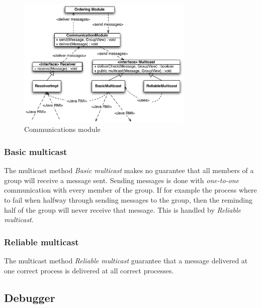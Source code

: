 \documentclass[titlepage, twocolumn, a4paper, 10pt]{article}
\begin{document}
\begin{figure}[!thb]
  \centering
  \includegraphics[width=3.3in]{images/ComModule.pdf}
  \caption{Communications module}
  \label{fig:images/commodule}
\end{figure}

\subsubsection{Basic multicast}\label{sec:basic-multicast}
The multicast method \textit{Basic multicast} makes no guarantee that
all members of a group will receive a message sent. Sending messages
is done with \textit{one-to-one} communication with every member of
the group. If for example the process where to fail when halfway
through sending messages to the group, then the reminding half of the
group will never receive that message. This is handled by
\textit{Reliable multicast}.

\subsubsection{Reliable multicast}\label{sec:reliable-multicast}
The multicast method \textit{Reliable multicast} guarantee that a
message delivered at one correct process is delivered at all correct
processes.

\subsection{Debugger}\label{sec:debugger}


\end{document}
